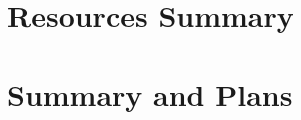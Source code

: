 \documentclass{dune} %
\begin{document}

\cleardoublepage


\cleardoublepage


\cleardoublepage


\cleardoublepage


\cleardoublepage

\part{Resources Summary} 

%

%

%






\part{Summary and Plans}




\end{document}
